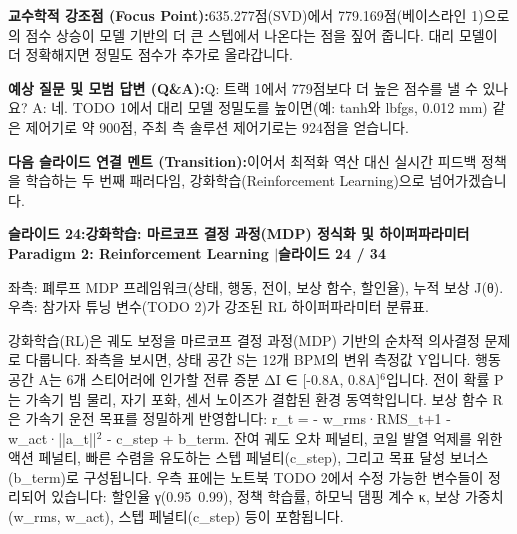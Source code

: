 \documentclass[11pt,a4paper]{article}
\begin{document}
\begin{tcolorbox}[colback=lightbg,colframe=bordergray,left=6pt,right=6pt,top=3pt,bottom=3pt,boxrule=0.6pt,arc=2.5pt]
\small
\noindent\textbf{\color{navy}교수학적 강조점 (Focus Point):}\enspace 635.277점(SVD)에서 779.169점(베이스라인 1)으로의 점수 상승이 모델 기반의 더 큰 스텝에서 나온다는 점을 짚어 줍니다. 대리 모델이 더 정확해지면 정밀도 점수가 추가로 올라갑니다.\par\vspace{0.3em}
\noindent\textbf{\color{successgreen}예상 질문 및 모범 답변 (Q\&A):}\enspace Q: 트랙 1에서 779점보다 더 높은 점수를 낼 수 있나요? A: 네. TODO 1에서 대리 모델 정밀도를 높이면(예: tanh와 lbfgs, 0.012 mm) 같은 제어기로 약 900점, 주최 측 솔루션 제어기로는 924점을 얻습니다.\par\vspace{0.3em}
\noindent\textbf{\color{accent}다음 슬라이드 연결 멘트 (Transition):}\enspace 이어서 최적화 역산 대신 실시간 피드백 정책을 학습하는 두 번째 패러다임, 강화학습(Reinforcement Learning)으로 넘어가겠습니다.
\end{tcolorbox}
\clearpage
\hypertarget{slide.24}{}
{}
\noindent\begin{tcolorbox}[colback=navy,colframe=navy,left=6pt,right=6pt,top=3pt,bottom=3pt,boxrule=0pt,arc=2pt]
{\large\bfseries\color{white}슬라이드 24:\enspace 강화학습: 마르코프 결정 과정(MDP) 정식화 및 하이퍼파라미터}\hfill{\footnotesize\bfseries\color{white!85!lightbg}Paradigm 2: Reinforcement Learning \enspace$|$\enspace 슬라이드 24 / 34}
\end{tcolorbox}
\vspace{0.2em}
\begin{tcolorbox}[colback=lightbg,colframe=bordergray,title={\footnotesize\bfseries\color{darkgray}슬라이드 시각 구성 요약},fontupper=\small,left=6pt,right=6pt,top=2.5pt,bottom=2.5pt,boxrule=0.6pt,arc=2.5pt]
좌측: 폐루프 MDP 프레임워크(상태, 행동, 전이, 보상 함수, 할인율), 누적 보상 J(θ). 우측: 참가자 튜닝 변수(TODO 2)가 강조된 RL 하이퍼파라미터 분류표.
\end{tcolorbox}
\vspace{0.2em}
\begin{tcolorbox}[colback=white,colframe=primaryblue,title={\footnotesize\bfseries\color{white}발표자 구두 대본 (Spoken Script)},fontupper=\small,left=6pt,right=6pt,top=3pt,bottom=3pt,boxrule=0.8pt,arc=2.5pt]
강화학습(RL)은 궤도 보정을 마르코프 결정 과정(MDP) 기반의 순차적 의사결정 문제로 다룹니다. 좌측을 보시면, 상태 공간 S는 12개 BPM의 변위 측정값 Y입니다. 행동 공간 A는 6개 스티어러에 인가할 전류 증분 ΔI ∈ [-0.8A, 0.8A]$^6$입니다. 전이 확률 P는 가속기 빔 물리, 자기 포화, 센서 노이즈가 결합된 환경 동역학입니다. 보상 함수 R은 가속기 운전 목표를 정밀하게 반영합니다: r\_t = - w\_rms·RMS\_{t+1} - w\_act·||a\_t||$^2$ - c\_step + b\_term. 잔여 궤도 오차 페널티, 코일 발열 억제를 위한 액션 페널티, 빠른 수렴을 유도하는 스텝 페널티(c\_step), 그리고 목표 달성 보너스(b\_term)로 구성됩니다. 우측 표에는 노트북 TODO 2에서 수정 가능한 변수들이 정리되어 있습니다: 할인율 γ(0.95~0.99), 정책 학습률, 하모닉 댐핑 계수 κ, 보상 가중치(w\_rms, w\_act), 스텝 페널티(c\_step) 등이 포함됩니다.
\end{tcolorbox}
\end{document}
